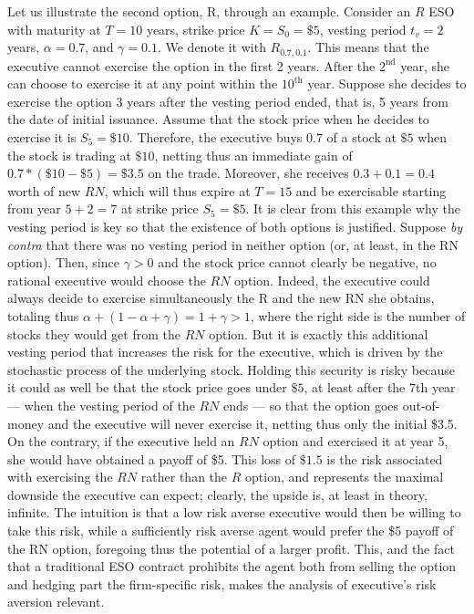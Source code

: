 Let us illustrate the second option, R, through an example. Consider an $R$ ESO with maturity at $T=10$ years, strike price $K=S_0=\$5$, vesting period $t_v=2$ years, $\alpha = 0.7$, and $\gamma=0.1$. We denote it with $R_{0.7, 0.1}$. This means that the executive cannot exercise the option in the first 2 years. After the $2^{\text{nd}}$ year, she can choose to exercise it at any point within the $10^{\text{th}}$ year. Suppose she decides to exercise the option 3 years after the vesting period ended, that is, 5 years from the date of initial issuance. Assume that the stock price when he decides to exercise it is $S_5 = \$10$. Therefore, the executive buys $0.7$ of a stock at $\$5$ when the stock is trading at $\$10$, netting thus an immediate gain of $0.7*(\$10-\$5)=\$3.5$ on the trade. Moreover, she receives $0.3+0.1=0.4$ worth of new $RN$, which will thus expire at $T=15$ and be exercisable starting from year $5+2=7$ at strike price $S_5=\$5$. 
It is clear from this example why the vesting period is key so that the existence of both options is justified. Suppose \textit{by contra} that there was no vesting period in neither option (or, at least, in the RN option). Then, since $\gamma > 0$ and the stock price cannot clearly be negative, no rational executive would choose the $RN$ option. Indeed, the executive could always decide to exercise simultaneously the R and the new RN she obtains, totaling thus $\alpha + (1-\alpha+\gamma)=1+\gamma > 1$, where the right side is the number of stocks they would get from the $RN$ option. But it is exactly this additional vesting period that increases the risk for the executive, which is driven by the stochastic process of the underlying stock. Holding this security is risky because it could as well be that the stock price goes under $\$5$, at least after the 7th year --- when the vesting period of the $RN$ ends --- so that the option goes out-of-money and the executive will never exercise it, netting thus only the initial \$3.5. On the contrary, if the executive held an $RN$ option and exercised it at year 5, she would have obtained a payoff of \$5. This loss of $\$1.5$ is the risk associated with exercising the $RN$ rather than the $R$ option, and represents the maximal downside the executive can expect; clearly, the upside is, at least in theory, infinite. The intuition is that a low risk averse executive would then be willing to take this risk, while a sufficiently risk averse agent would prefer the \$5 payoff of the RN option, foregoing thus the potential of a larger profit. 
This, and the fact that a traditional ESO contract prohibits the agent both from selling the option and hedging part the firm-specific risk, makes the analysis of executive's risk aversion relevant.

